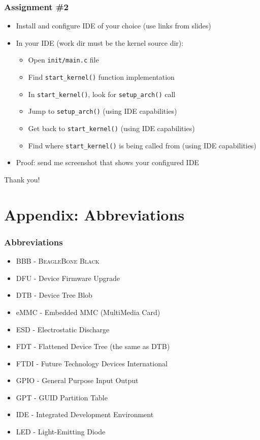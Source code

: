 \documentclass[aspectratio=169]{beamer}
\begin{document}
\begin{frame}
  \frametitle{Assignment \#2}
  \begin{itemize}
    \item Install and configure IDE of your choice (use links from slides)
    \item In your IDE (work dir must be the kernel source dir):
      \begin{itemize}
      \item Open \texttt{init/main.c} file
      \item Find \texttt{start\_kernel()} function implementation
      \item In \texttt{start\_kernel()}, look for \texttt{setup\_arch()} call
      \item Jump to \texttt{setup\_arch()} (using IDE capabilities)
      \item Get back to \texttt{start\_kernel()} (using IDE capabilities)
      \item Find where \texttt{start\_kernel()} is being called from (using IDE
            capabilities)
      \end{itemize}
    \item Proof: send me screenshot that shows your configured IDE
  \end{itemize}
\end{frame}

\begin{frame}[standout]
  Thank you!
\end{frame}

\section*{Appendix: Abbreviations}

\begin{frame}
  \frametitle{Abbreviations}
  \begin{itemize}
    \item BBB - \textsc{BeagleBone Black}
    \item DFU - Device Firmware Upgrade
    \item DTB - Device Tree Blob
    \item eMMC - Embedded MMC (MultiMedia Card)
    \item ESD - Electrostatic Discharge
    \item FDT - Flattened Device Tree (the same as DTB)
    \item FTDI - Future Technology Devices International
    \item GPIO - General Purpose Input Output
    \item GPT - GUID Partition Table
    \item IDE - Integrated Development Environment
    \item LED - Light-Emitting Diode
  \end{itemize}
\end{frame}
\end{document}
